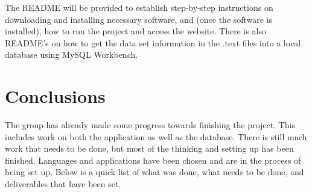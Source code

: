 \documentclass{Group6_Phase2}
\begin{document}
The README will be provided to establish step-by-step instructions on downloading and installing necessary software, and (once the software is installed), how to run the project and access the website. There is also README's on how to get the data set information in the .text files into a local database using MySQL Workbench. 


\section{Conclusions}
The group has already made some progress towards finishing the project. This includes work on both the application as well as the database. There is still much work that needs to be done, but most of the thinking and setting up has been finished. Languages and applications have been chosen and are in the process of being set up. Below is a quick list of what was done, what needs to be done, and deliverables that have been set.  
\end{document}
